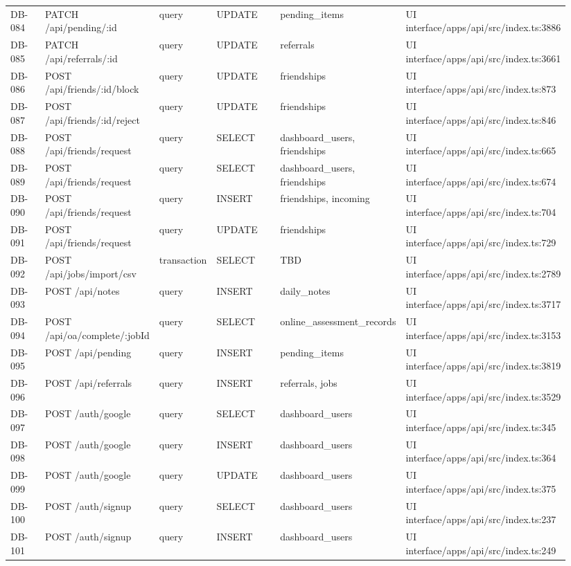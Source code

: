 \documentclass[11pt]{article}
\begin{document}
\begin{longtable}{p{0.10\linewidth}p{0.19\linewidth}p{0.10\linewidth}p{0.18\linewidth}p{0.16\linewidth}p{0.21\linewidth}}
DB-084 & PATCH /api/pending/:id & query & UPDATE & pending\_items & UI interface/apps/api/src/index.ts:3886 \\
DB-085 & PATCH /api/referrals/:id & query & UPDATE & referrals & UI interface/apps/api/src/index.ts:3661 \\
DB-086 & POST /api/friends/:id/block & query & UPDATE & friendships & UI interface/apps/api/src/index.ts:873 \\
DB-087 & POST /api/friends/:id/reject & query & UPDATE & friendships & UI interface/apps/api/src/index.ts:846 \\
DB-088 & POST /api/friends/request & query & SELECT & dashboard\_users, friendships & UI interface/apps/api/src/index.ts:665 \\
DB-089 & POST /api/friends/request & query & SELECT & dashboard\_users, friendships & UI interface/apps/api/src/index.ts:674 \\
DB-090 & POST /api/friends/request & query & INSERT & friendships, incoming & UI interface/apps/api/src/index.ts:704 \\
DB-091 & POST /api/friends/request & query & UPDATE & friendships & UI interface/apps/api/src/index.ts:729 \\
DB-092 & POST /api/jobs/import/csv & transaction & SELECT & TBD & UI interface/apps/api/src/index.ts:2789 \\
DB-093 & POST /api/notes & query & INSERT & daily\_notes & UI interface/apps/api/src/index.ts:3717 \\
DB-094 & POST /api/oa/complete/:jobId & query & SELECT & online\_assessment\_records & UI interface/apps/api/src/index.ts:3153 \\
DB-095 & POST /api/pending & query & INSERT & pending\_items & UI interface/apps/api/src/index.ts:3819 \\
DB-096 & POST /api/referrals & query & INSERT & referrals, jobs & UI interface/apps/api/src/index.ts:3529 \\
DB-097 & POST /auth/google & query & SELECT & dashboard\_users & UI interface/apps/api/src/index.ts:345 \\
DB-098 & POST /auth/google & query & INSERT & dashboard\_users & UI interface/apps/api/src/index.ts:364 \\
DB-099 & POST /auth/google & query & UPDATE & dashboard\_users & UI interface/apps/api/src/index.ts:375 \\
DB-100 & POST /auth/signup & query & SELECT & dashboard\_users & UI interface/apps/api/src/index.ts:237 \\
DB-101 & POST /auth/signup & query & INSERT & dashboard\_users & UI interface/apps/api/src/index.ts:249 \\

\end{longtable}
\end{document}
